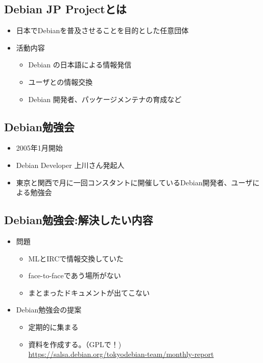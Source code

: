 \documentclass[mingoth,a4paper]{jsarticle}
\begin{document}


\subsection{Debian JP Projectとは}
  
\begin{itemize}
  \item 日本でDebianを普及させることを目的とした任意団体
  \item 活動内容
  \begin{itemize}
    \item Debian の日本語による情報発信
    \item ユーザとの情報交換
    \item Debian 開発者、パッケージメンテナの育成など
  \end{itemize}
\end{itemize}



\subsection{Debian勉強会}
  
\begin{itemize}
 \item 2005年1月開始
 \item Debian Developer 上川さん発起人
\item 東京と関西で月に一回コンスタントに開催しているDebian開発者、ユーザによる勉強会
\end{itemize}





\subsection{Debian勉強会:解決したい内容}
\begin{itemize}
 \item 問題
    \begin{itemize}
	\item MLとIRCで情報交換していた
	\item face-to-faceであう場所がない
	\item まとまったドキュメントが出てこない
    \end{itemize}
 \item Debian勉強会の提案
    \begin{itemize}
	\item 定期的に集まる
	\item 資料を作成する。（GPLで！) \\
	  {\small \url{https://salsa.debian.org/tokyodebian-team/monthly-report}}
    \end{itemize}
\end{itemize}
\end{document}
